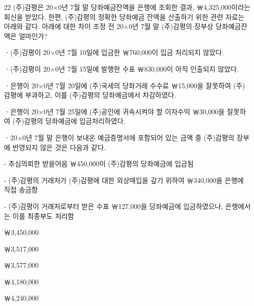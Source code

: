 \begin{question}{22}
(주)감평은 20×0년 7월 말 당좌예금잔액을 은행에 조회한 결과, ￦4,325,000이라는 회신을 받았다. 한편, (주)감평의 정확한 당좌예금 잔액을 산출하기 위한 관련 자료는 아래와 같다. 아래에 대한 차이 조정 전 20×0년 7월 말 (주)감평의 장부상 당좌예금잔액은 얼마인가?
\begin{framedtext}
ㆍ(주)감평이 20×0년 7월 10일에 입금한 ￦760,000이 입금 처리되지 않았다. \par
ㆍ(주)감평이 20×0년 7월 15일에 발행한 수표 ￦830,000이 아직 인출되지 않았다. \par
ㆍ은행이 20×0년 7월 20일에 (주)국세의 당좌거래 수수료 ￦15,000을 잘못하여 (주)감평에 부과하고, 이를 (주)감평의 당좌예금에서 차감하였다. \par
ㆍ은행이 20×0년 7월 25일에 (주)공인에 귀속시켜야 할 이자수익 ￦30,000을 잘못하여 (주)감평의 당좌예금에 입금처리하였다. \par
ㆍ20×0년 7월 말 은행이 보내온 예금증명서에 포함되어 있는 금액 중 (주)감평의 장부에 반영되지 않은 것은 다음과 같다. \par
- 추심의뢰한 받을어음 ￦450,000이 (주)감평의 당좌예금에 입금됨 \par
- (주)감평의 거래처가 (주)감평에 대한 외상매입을 갚기 위하여 ￦340,000을 은행에 직접 송금함 \par
- (주)감평이 거래처로부터 받은 수표 ￦127,000을 당좌예금에 입금하였으나, 은행에서는 이를 최종부도 처리함 \par
\end{framedtext}
\begin{choices}
  \item ￦3,450,000
  \item ￦3,517,000
  \item ￦3,577,000
  \item ￦4,180,000
  \item ￦4,240,000
\end{choices}
\end{question}
